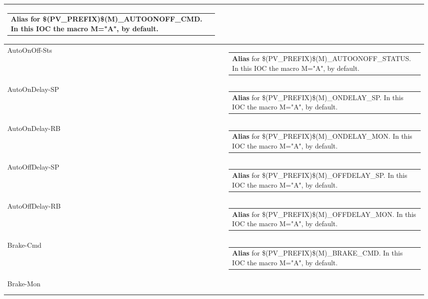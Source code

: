 \documentclass[openany]{article}
\begin{document}
\begin{longtable}{| m{4.5cm} m{2.5cm}  m{8.5cm} |}
\begin{tabular}{@{}m{6cm}@{}}
                \textbf{\color{blue} Alias} for \$(PV\_PREFIX)\$(M)\_AUTOONOFF\_CMD. In this IOC the macro M="A", by default.
            \end{tabular} \hypertarget{}{}\\ \hline
        AutoOnOff-Sts &  & \begin{tabular}{@{}m{6cm}@{}}
                \textbf{\color{blue} Alias} for \$(PV\_PREFIX)\$(M)\_AUTOONOFF\_STATUS. In this IOC the macro M="A", by default.
            \end{tabular} \hypertarget{pv:auto-on-delay}{}\\ \hline
        AutoOnDelay-SP &  & \begin{tabular}{@{}m{6cm}@{}}
                \textbf{\color{blue} Alias} for \$(PV\_PREFIX)\$(M)\_ONDELAY\_SP. In this IOC the macro M="A", by default.
            \end{tabular} \hypertarget{}{}\\ \hline
        AutoOnDelay-RB &  & \begin{tabular}{@{}m{6cm}@{}}
                \textbf{\color{blue} Alias} for \$(PV\_PREFIX)\$(M)\_ONDELAY\_MON. In this IOC the macro M="A", by default.
            \end{tabular} \hypertarget{pv:auto-off-delay}{}\\ \hline
        AutoOffDelay-SP &  & \begin{tabular}{@{}m{6cm}@{}}
                \textbf{\color{blue} Alias} for \$(PV\_PREFIX)\$(M)\_OFFDELAY\_SP. In this IOC the macro M="A", by default.
            \end{tabular} \hypertarget{}{}\\ \hline
        AutoOffDelay-RB &  & \begin{tabular}{@{}m{6cm}@{}}
                \textbf{\color{blue} Alias} for \$(PV\_PREFIX)\$(M)\_OFFDELAY\_MON. In this IOC the macro M="A", by default.
            \end{tabular} \hypertarget{pv:brake-cmd}{}\\ \hline
        Brake-Cmd &  & \begin{tabular}{@{}m{6cm}@{}}
                \textbf{\color{blue} Alias} for \$(PV\_PREFIX)\$(M)\_BRAKE\_CMD. In this IOC the macro M="A", by default.
            \end{tabular} \hypertarget{pv:brake-mon}{}\\ \hline
        Brake-Mon &  & \begin{tabular}{@{}m{6cm}@{}}

\end{tabular}
\end{longtable}
\end{document}
